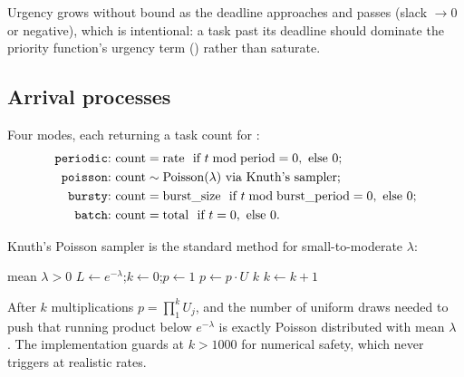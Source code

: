 Urgency grows without bound as the deadline approaches and passes
(slack $\rightarrow 0$ or negative), which is intentional: a task past its
deadline should dominate the priority function's urgency term
() rather than saturate.

\subsection{Arrival processes}
\label{sec:arrivals}

Four modes, each returning a task count for :
\begin{align*}
  \text{\code{periodic}:}\ & \text{count} = \mathrm{rate} \ \text{ if } t \bmod \mathrm{period} = 0,\ \text{else } 0;\\
  \text{\code{poisson}:}\ & \text{count} \sim \mathrm{Poisson}(\lambda) \text{ via Knuth's sampler};\\
  \text{\code{bursty}:}\ & \text{count} = \mathrm{burst\_size} \ \text{ if } t \bmod \mathrm{burst\_period} = 0,\ \text{else } 0;\\
  \text{\code{batch}:}\ & \text{count} = \mathrm{total} \ \text{ if } t = 0,\ \text{else } 0.
\end{align*}

Knuth's Poisson sampler is the standard method for small-to-moderate $\lambda$:

\begin{algorithm}[H]
\caption{Knuth's Poisson sampler ()}
\begin{algorithmic}[1]
\Require mean $\lambda > 0$
\State $L \gets e^{-\lambda}$;\quad $k \gets 0$;\quad $p \gets 1$
\Loop
  \State $p \gets p \cdot U$ 
   \Return $k$ \EndIf
  \State $k \gets k + 1$
\EndLoop
\end{algorithmic}
\end{algorithm}

After $k$ multiplications $p = \prod_{1}^{k} U_j$, and the number of uniform
draws needed to push that running product below $e^{-\lambda}$ is exactly
Poisson distributed with mean $\lambda$ \citep{knuth1997taocp2}. The
implementation guards at $k > 1000$ for numerical safety, which never triggers
at realistic rates.
